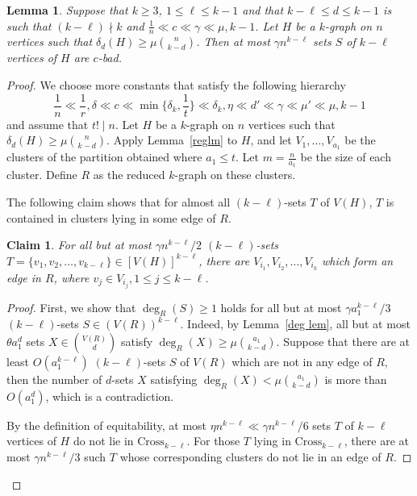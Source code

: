 \documentclass[11pt, reqno]{amsart}    	%
\newtheorem{claim}[thm]{Claim}
\newtheorem{lemma}[thm]{Lemma}
\theoremstyle{definition}
\numberwithin{equation}{section}
\begin{document}
\begin{appendix}
		\begin{lemma} \label{lem cbad}
			Suppose that $k\ge3$, $1\leq \ell \leq k-1$ and that $k-\ell\leq d \leq k-1$ is such that $(k-\ell)\nmid k$ and $\frac{1}{n} \ll c \ll \gamma  \ll \mu,k-1$. Let $H$ be a $k$-graph on $n$ vertices such that  $\delta_d(H)\ge \mu \binom{n}{k-d}$. Then at most $\gamma n^{k-\ell}$ sets $S$ of $k-\ell$ vertices of $H$ are $c$-bad.	
		\end{lemma}
		\begin{proof} We choose more constants that satisfy the following hierarchy
			\[\frac{1}{n} \ll \frac{1}{r},\delta \ll c \ll \min \{\delta_{k},\frac{1}{t}\} \ll \delta_{k},\eta \ll d' \ll \gamma\ll \mu'\ll \mu,k-1\]
			and assume that $t!\mid n$. Let $H$ be a $k$-graph on $n$ vertices such that  $\delta_d(H)\ge \mu \binom{n}{k-d}$. Apply Lemma~\ref{reglm} to $H$, and let $V_{1},\dots,V_{a_{1}}$ be the clusters of the partition obtained where $ a_1\le t $. Let $m = \frac{n}{a_{1}}$ be the size of each cluster. Define $R$ as the reduced $ k$-graph on these clusters.
			
			The following claim shows that for almost all $(k-\ell)$-sets $ T $  of $V(H)$, $ T $ is contained in clusters lying  in some  edge of $R$.
			\begin{claim} \label{claim2}
				For all but at most $\gamma n^{k-\ell}/2$  $(k-\ell)$-sets $T=\{v_{1},v_{2},\dots,v_{k-\ell} \} \in [V(H)]^{k-\ell}$, there are $V_{i_{1}},V_{i_{2}},\dots,V_{i_{k}}$ which form an edge in $R$, where $v_{j}\in V_{i_{j}}, 1\le j \le k-\ell$.
			\end{claim}
			\begin{proof}
				First, we show that $\deg_{R}(S)\ge 1 $ holds for all but at most $\gamma a_{1}^{k-\ell}/3$  $(k-\ell)$-sets 
				$S\in (V(R))^{k-\ell}$. Indeed, by Lemma~\ref{deg lem}, all but at most $\theta a_{1}^{d}$ sets $X\in \binom{V(R)}{d}$ satisfy $\deg_{R}(X)\ge \mu \binom{a_{1}}{k-d} $. Suppose that there are at least $O(a_{1}^{k-\ell})$ $(k-\ell)$-sets $S$ of $V(R)$ which are not in any edge of $R$, then the number of $d$-sets $X$ satisfying $\deg_{R}(X)< \mu  \binom{a_{1}}{k-d}$ is more than $O(a_{1}^{d}) $, which is a contradiction.
				
				By the definition of equitability, at most $\eta n^{k-\ell}\ll \gamma n^{k-\ell}/6$ sets $T$ of $k-\ell$ vertices of $H$ do not lie in $\text{Cross}_{k-\ell}$. For those $T$ lying in $\text{Cross}_{k-\ell}$,  there are at most $\gamma {n}^{k-\ell}/3$ such $T$ whose corresponding clusters do not lie in an edge of $ R $.
			\end{proof}
			

\end{proof}
\end{appendix}
\end{document}
